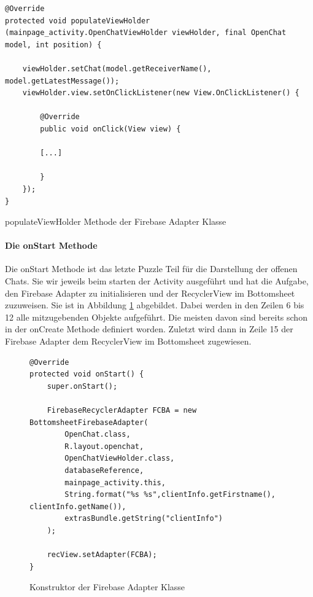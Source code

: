 \documentclass[a4paper,11pt]{report}
\newenvironment{code}{\captionsetup{type=figure}}{}
\begin{document}
\begin{code}
	\begin{center}
		\begin{verbatim}
@Override
protected void populateViewHolder (mainpage_activity.OpenChatViewHolder viewHolder, final OpenChat model, int position) {
	
	viewHolder.setChat(model.getReceiverName(), model.getLatestMessage());
	viewHolder.view.setOnClickListener(new View.OnClickListener() {
		
		@Override
		public void onClick(View view) {
		
		[...]
		
		}
	});
}
		\end{verbatim}
		\caption{populateViewHolder Methode der Firebase Adapter Klasse}\label{java:FirebaseAdapterPop}
	\end{center}
\end{code}

			\paragraph{Die onStart Methode}
			Die onStart Methode ist das letzte Puzzle Teil für die Darstellung der offenen Chats. Sie wir jeweils beim starten der Activity ausgeführt und hat die Aufgabe, den Firebase Adapter zu initialisieren und der RecyclerView im Bottomsheet zuzuweisen. Sie ist in Abbildung \ref{java:onStart} abgebildet. Dabei werden in den Zeilen 6 bis 12 alle mitzugebenden Objekte aufgeführt. Die meisten davon sind bereits schon in der onCreate Methode definiert worden. Zuletzt wird dann in Zeile 15 der Firebase Adapter dem RecyclerView im Bottomsheet zugewiesen.
\begin{figure}
	\begin{center}
		\begin{verbatim}
@Override
protected void onStart() {
	super.onStart();

	FirebaseRecyclerAdapter FCBA = new BottomsheetFirebaseAdapter(
		OpenChat.class,
		R.layout.openchat,
		OpenChatViewHolder.class,
		databaseReference,
		mainpage_activity.this,
		String.format("%s %s",clientInfo.getFirstname(), clientInfo.getName()),
		extrasBundle.getString("clientInfo")
	);

	recView.setAdapter(FCBA);
}
		\end{verbatim}
		\caption{Konstruktor der Firebase Adapter Klasse}\label{java:onStart}
	\end{center}

\end{figure}			
\end{document}
